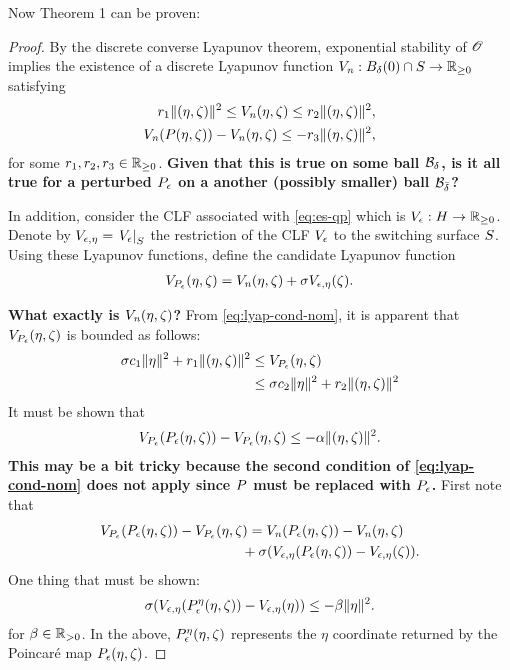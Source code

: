 \documentclass[twocolumn]{article}
\begin{document}
Now Theorem 1 can be proven:
\begin{proof}
  By the discrete converse Lyapunov theorem, exponential stability of $\Orbit$ implies the existence of a discrete Lyapunov function $\Vn : B_{\delta}(0) \cap \S \to \Rnn$ satisfying
  \begin{align}
    \nonumber
    r_{1} \| (\eta, \zeta) \|^{2} \leq \Vn(\eta, \zeta) \leq r_{2} \| (\eta, \zeta) \|^2,\\
    \Vn(\P(\eta, \zeta)) - \Vn(\eta, \zeta) \leq -r_{3} \| (\eta, \zeta) \|^{2},
    \label{eq:lyap-cond-nom}
  \end{align}
  for some $r_{1}, r_{2}, r_{3} \in \Rnn$.
  {\bf Given that this is true on some ball $\B_{\delta}$, is it all true for a perturbed $\Pe$ on a another (possibly smaller) ball $\B_{\bar \delta}$?}
  
  In addition, consider the CLF associated with \eqref{eq:es-qp} which is $\Ve : \Eta \to \Rnn$.
  Denote by $\Vee = \VeS$ the restriction of the CLF $\Ve$ to the switching surface $\S$.
  Using these Lyapunov functions, define the candidate Lyapunov function
  \begin{align}
    \VP(\eta, \zeta) = \Vn(\eta, \zeta) + \sigma \Vee(\zeta).
  \end{align}

  {\bf What exactly is $\Vn(\eta, \zeta)$?}
  From \eqref{eq:lyap-cond-nom}, it is apparent that $\VP(\eta, \zeta)$ is bounded as follows:
  \begin{align}
    \sigma c_{1} \| \eta \|^{2} + r_{1} \| (\eta, \zeta) \|^{2} &\leq \VP(\eta, \zeta)\\
    \nonumber
    &\leq \sigma c_{2} \| \eta \|^{2} + r_{2} \| (\eta, \zeta) \|^{2}
  \end{align}
  It must be shown that
  \begin{align}
    \VP(\Pe(\eta, \zeta)) - \VP(\eta, \zeta) \leq -\alpha \| (\eta, \zeta) \|^{2}.
  \end{align}
      {\bf This may be a bit tricky because the second condition of \eqref{eq:lyap-cond-nom} does not apply since $\P$ must be replaced with $\Pe$.}
  First note that
  \begin{align}
    \lefteqn{\VP(\Pe(\eta, \zeta)) - \VP(\eta, \zeta) = \Vn(\Pe(\eta, \zeta)) - \Vn(\eta, \zeta)}\\
    \nonumber
    &&\hspace{3.2cm}\mbox{} + \sigma(\Vee(\Pe(\eta, \zeta)) - \Vee(\zeta)).
  \end{align}
  One thing that must be shown:
  \begin{align}
    \sigma(\Vee(\Pe^{\eta}(\eta, \zeta)) - \Vee(\eta)) \leq -\beta \| \eta \|^{2}.
  \end{align}
  for $\beta \in \Rpd$.
  In the above, $\Pe^{\eta}(\eta, \zeta)$ represents the $\eta$ coordinate returned by the Poincar{\'e} map $\Pe(\eta, \zeta)$.
\end{proof}
\end{document}
